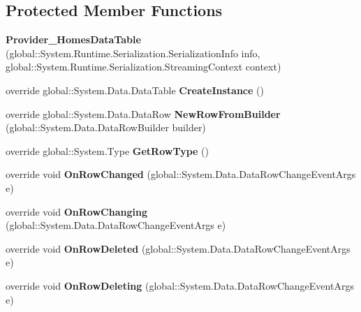 \subsection*{Protected Member Functions}
\begin{DoxyCompactItemize}
\item 
\mbox{\label{class_a_f_h___scheduler_1_1_home_inspection_data_set_1_1_provider___homes_data_table_a55a4235425715c4143994ed010b96cdf}} 
{\bfseries Provider\+\_\+\+Homes\+Data\+Table} (global\+::\+System.\+Runtime.\+Serialization.\+Serialization\+Info info, global\+::\+System.\+Runtime.\+Serialization.\+Streaming\+Context context)
\item 
\mbox{\label{class_a_f_h___scheduler_1_1_home_inspection_data_set_1_1_provider___homes_data_table_af863b23498cd2ce592371c9643fec66a}} 
override global\+::\+System.\+Data.\+Data\+Table {\bfseries Create\+Instance} ()
\item 
\mbox{\label{class_a_f_h___scheduler_1_1_home_inspection_data_set_1_1_provider___homes_data_table_afac2260b3cf657894df19edac35ac3ec}} 
override global\+::\+System.\+Data.\+Data\+Row {\bfseries New\+Row\+From\+Builder} (global\+::\+System.\+Data.\+Data\+Row\+Builder builder)
\item 
\mbox{\label{class_a_f_h___scheduler_1_1_home_inspection_data_set_1_1_provider___homes_data_table_a8d0331e3c8083e855dcb8beb616fe664}} 
override global\+::\+System.\+Type {\bfseries Get\+Row\+Type} ()
\item 
\mbox{\label{class_a_f_h___scheduler_1_1_home_inspection_data_set_1_1_provider___homes_data_table_ad4345c208f6a7fbd352403f21f6f0722}} 
override void {\bfseries On\+Row\+Changed} (global\+::\+System.\+Data.\+Data\+Row\+Change\+Event\+Args e)
\item 
\mbox{\label{class_a_f_h___scheduler_1_1_home_inspection_data_set_1_1_provider___homes_data_table_a738ecf717d1f2da662830efdb521a622}} 
override void {\bfseries On\+Row\+Changing} (global\+::\+System.\+Data.\+Data\+Row\+Change\+Event\+Args e)
\item 
\mbox{\label{class_a_f_h___scheduler_1_1_home_inspection_data_set_1_1_provider___homes_data_table_a1b0bd1ec2f26f59623fa38e5b5290735}} 
override void {\bfseries On\+Row\+Deleted} (global\+::\+System.\+Data.\+Data\+Row\+Change\+Event\+Args e)
\item 
\mbox{\label{class_a_f_h___scheduler_1_1_home_inspection_data_set_1_1_provider___homes_data_table_a40d9464f5ccb8aef017a933cdba835b7}} 
override void {\bfseries On\+Row\+Deleting} (global\+::\+System.\+Data.\+Data\+Row\+Change\+Event\+Args e)
\end{DoxyCompactItemize}

